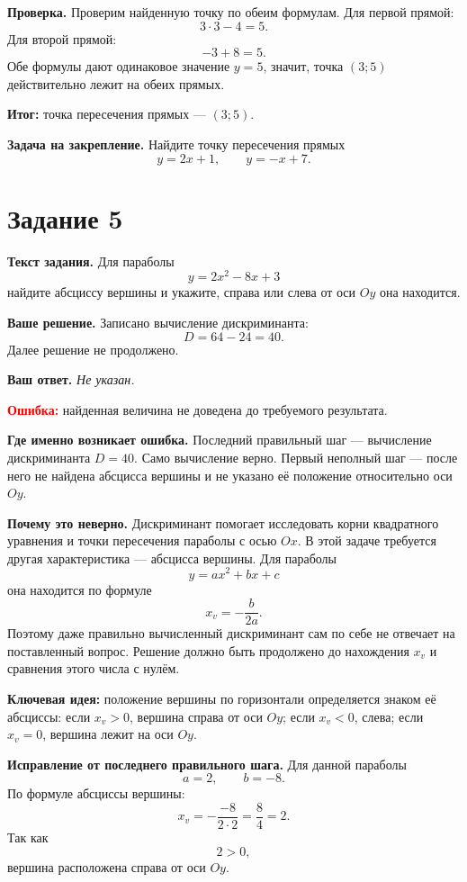 \documentclass[12pt,a4paper]{article}
\newcommand{\studentanswer}[1]{\textit{#1}}
\begin{document}
\textbf{Проверка.}
Проверим найденную точку по обеим формулам. Для первой прямой:
\[
3\cdot 3-4=5.
\]
Для второй прямой:
\[
-3+8=5.
\]
Обе формулы дают одинаковое значение $y=5$, значит, точка $(3;5)$ действительно лежит на обеих прямых.

\textcolor{teal!60!black}{\textbf{Итог:}}
точка пересечения прямых --- $(3;5)$.

\textbf{Задача на закрепление.}
Найдите точку пересечения прямых
\[
y=2x+1, \qquad y=-x+7.
\]

\newpage
{}\label{task:5}
\section*{Задание 5}

\textbf{Текст задания.}
Для параболы
\[
y=2x^2-8x+3
\]
найдите абсциссу вершины и укажите, справа или слева от оси $Oy$ она находится.

\textbf{Ваше решение.}
Записано вычисление дискриминанта:
\[
D=64-24=40.
\]
Далее решение не продолжено.

\textbf{Ваш ответ.}
\studentanswer{Не указан.}

\textcolor{red}{\textbf{Ошибка:}} найденная величина не доведена до требуемого результата.

\textbf{Где именно возникает ошибка.}
Последний правильный шаг --- вычисление дискриминанта $D=40$. Само вычисление верно. Первый неполный шаг --- после него не найдена абсцисса вершины и не указано её положение относительно оси $Oy$.

\textbf{Почему это неверно.}
Дискриминант помогает исследовать корни квадратного уравнения и точки пересечения параболы с осью $Ox$. В этой задаче требуется другая характеристика --- абсцисса вершины. Для параболы
\[
y=ax^2+bx+c
\]
она находится по формуле
\[
x_v=-\frac{b}{2a}.
\]
Поэтому даже правильно вычисленный дискриминант сам по себе не отвечает на поставленный вопрос. Решение должно быть продолжено до нахождения $x_v$ и сравнения этого числа с нулём.

\textcolor{blue!60!black}{\textbf{Ключевая идея:}}
положение вершины по горизонтали определяется знаком её абсциссы: если $x_v>0$, вершина справа от оси $Oy$; если $x_v<0$, слева; если $x_v=0$, вершина лежит на оси $Oy$.

\textbf{Исправление от последнего правильного шага.}
Для данной параболы
\[
a=2, \qquad b=-8.
\]
По формуле абсциссы вершины:
\[
x_v=-\frac{-8}{2\cdot 2}=\frac{8}{4}=2.
\]
Так как
\[
2>0,
\]
вершина расположена справа от оси $Oy$.
\end{document}
